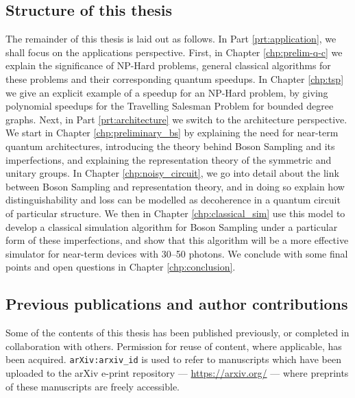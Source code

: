 \subsection{Structure of this thesis}

The remainder of this thesis is laid out as follows. In Part \ref{prt:application}, we shall focus on the applications perspective. First, in Chapter \ref{chp:prelim-q-c} we explain the significance of NP-Hard problems, general classical algorithms for these problems and their corresponding quantum speedups. In Chapter \ref{chp:tsp} we give an explicit example of a speedup for an NP-Hard problem, by giving polynomial speedups for the Travelling Salesman Problem for bounded degree graphs. Next, in Part \ref{prt:architecture} we switch to the architecture perspective. We start in Chapter \ref{chp:preliminary_bs} by explaining the need for near-term quantum architectures, introducing the theory behind Boson Sampling and its imperfections, and explaining the representation theory of the symmetric and unitary groups. In Chapter \ref{chp:noisy_circuit}, we go into detail about the link between Boson Sampling and representation theory, and in doing so explain how distinguishability and loss can be modelled as decoherence in a quantum circuit of particular structure. We then in Chapter \ref{chp:classical_sim} use this model to develop a classical simulation algorithm for Boson Sampling under a particular form of these imperfections, and show that this algorithm will be a more effective simulator for near-term devices with 30--50 photons. We conclude with some final points and open questions in Chapter \ref{chp:conclusion}.

\subsection{Previous publications and author contributions}
\label{ssec:publications}

Some of the contents of this thesis has been published previously, or completed in collaboration with others. Permission for reuse of content, where applicable, has been acquired. {\tt arXiv:arxiv\_id} is used to refer to manuscripts which have been uploaded to the arXiv e-print repository --- \url{https://arxiv.org/} --- where preprints of these manuscripts are freely accessible.

